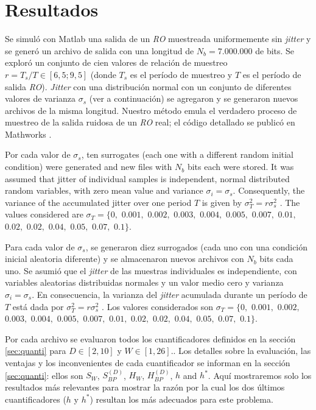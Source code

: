 \section{Resultados}
\label{sec:resu}

Se simuló con Matlab\textsuperscript{\textregistered} una salida de un \emph{RO} muestreada uniformemente sin \textit{jitter} y se generó un archivo de salida con una longitud de $N_b = 7.000.000$ de bits.
Se exploró un conjunto de cien valores de relación de muestreo $r = T_s/T \in [6,5; 9,5]$ (donde $T_s$ es el período de muestreo y $T$ es el período de salida \emph{RO}).
\textit{Jitter} con una distribución normal con un conjunto de diferentes valores de varianza $\sigma_s$ (ver a continuación) se agregaron y se generaron nuevos archivos de la misma longitud.
Nuestro método emula el verdadero proceso de muestreo de la salida ruidosa de un \emph{RO} real; el código detallado se publicó en Mathworks \cite{MathworksMaxi}.

Por cada valor de $\sigma_s$, ten surrogates (each one with a different random initial condition) were generated and new files with $N_b$ bits each were stored. It was assumed that jitter of individual samples is independent, normal distributed random variables, with zero mean value and variance $\sigma_i=\sigma_s$. Consequently, the variance of the accumulated jitter over one period $T$ is given by $\sigma^2_T=r \sigma^2_s$ \cite{Valtchanov2008}. The values considered  are $\sigma_T=\{0,$ $0.001,$ $0.002,$ $0.003,$ $0.004,$ $0.005,$ $0.007,$ $0.01,$ $0.02,$ $0.02,$ $0.04,$ $0.05,$ $0.07,$ $0.1\}$.

Para cada valor de $\sigma_s$, se generaron diez surrogados (cada uno con una condición inicial aleatoria diferente) y se almacenaron nuevos archivos con $N_b$ bits cada uno. Se asumió que el \textit{jitter} de las muestras individuales es independiente, con variables aleatorias distribuidas normales y un valor medio cero y varianza $\sigma_i = \sigma_s$.
En consecuencia, la varianza del \textit{jitter} acumulada durante un período de $T$ está dada por $\sigma^2_T = r \sigma^2_s $ \cite{Valtchanov2008}.
Los valores considerados son $\sigma_T=\{0,$ $0.001,$ $0.002,$ $0.003,$ $0.004,$ $0.005,$ $0.007,$ $0.01,$ $0.02,$ $0.02,$ $0.04,$ $0.05,$ $0.07,$ $0.1\}$.

Por cada archivo se evaluaron todos los cuantificadores definidos en la sección \ref{sec:quanti} para $D\in[2,10]$ y $W\in[1,26]$..
Los detalles sobre la evaluación, las ventajas y los inconvenientes de cada cuantificador se informan en la sección \ref{sec:quanti}: ellos son $S_W$, $S^{(D)}_{BP}$, $H_{W}$, $H^{(D)}_{BP}$, $h$ and $h^*$. 
Aquí mostraremos solo los resultados más relevantes para mostrar la razón por la cual los dos últimos cuantificadores ($h$ y $h^*$) resultan los más adecuados para este problema.

